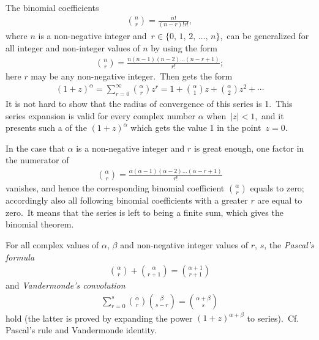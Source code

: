 \documentclass[12pt]{article}
\begin{document}
The binomial coefficients
\begin{align}
    {n\choose r} = \frac{n!}{(n\!-\!r)!r!},
\end{align}
where $n$ is a non-negative integer and\, $r \in \{0,\,1,\,2,\,\ldots,\,n\}$,\,
can be generalized for all integer and non-integer values of $n$ by using the  form
\begin{align}
    {n\choose r} = \frac{n(n\!-\!1)(n\!-\!2)\ldots(n\!-\!r\!+\!1)}{r!}; 
\end{align}
here $r$ may be any non-negative integer.\, Then  gets the  form 
\begin{align}
    (1\!+\!z)^{\alpha} = \sum_{r = 0}^{\infty}{\alpha\choose r}z^r 
 = 1\!+\!{\alpha\choose1}z\!+\!{\alpha\choose 2}z^2\!+\cdots
\end{align}
It is not hard to show that the radius of convergence of this series is 1.\, This series expansion is valid for every complex number $\alpha$ when\, $|z| < 1$,\, and it presents such a  of the  $(1\!+\!z)^{\alpha}$ which gets the value 1 in the point\, $z = 0$.

In the case that $\alpha$ is a non-negative integer and $r$ is great enough, one factor in the numerator of 
\begin{align}
{\alpha\choose r} = 
  \frac{\alpha(\alpha\!-\!1)(\alpha\!-\!2)\ldots(\alpha\!-\!r\!+\!1)}{r!} 
\end{align}
vanishes, and hence the corresponding binomial coefficient ${\alpha\choose r}$ equals to zero; accordingly also all following binomial coefficients with a greater $r$ are equal to zero.\, It means that the series is left to being a finite sum, which gives the binomial theorem.

For all complex values of $\alpha$, $\beta$ and non-negative integer values of $r$, $s$, the {\em Pascal's formula}
\begin{align}
  {\alpha\choose r}\!+\!{\alpha\choose r\!+\!1} = {{\alpha\!+\!1}\choose{r\!+\!1}}
\end{align}
and {\em Vandermonde's convolution}
\begin{align}
 \sum_{r = 0}^s{\alpha\choose r}\!{\beta\choose{s\!-\!r}} = {{\alpha\!+\!\beta}\choose s}
\end{align}
hold (the latter is proved by expanding the power $(1\!+\!z)^{\alpha+\beta}$ to series).\, Cf. Pascal's rule and Vandermonde identity.
\end{document}
